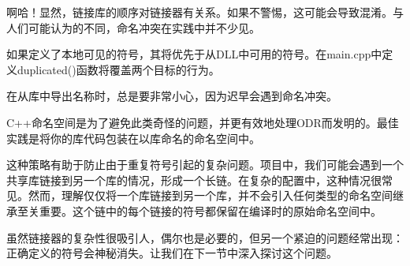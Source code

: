 啊哈！显然，链接库的顺序对链接器有关系。如果不警惕，这可能会导致混淆。与人们可能认为的不同，命名冲突在实践中并不少见。

如果定义了本地可见的符号，其将优先于从DLL中可用的符号。在main.cpp中定义duplicated()函数将覆盖两个目标的行为。

在从库中导出名称时，总是要非常小心，因为迟早会遇到命名冲突。


C++命名空间是为了避免此类奇怪的问题，并更有效地处理ODR而发明的。最佳实践是将你的库代码包装在以库命名的命名空间中。

这种策略有助于防止由于重复符号引起的复杂问题。项目中，我们可能会遇到一个共享库链接到另一个库的情况，形成一个长链。在复杂的配置中，这种情况很常见。然而，理解仅仅将一个库链接到另一个库，并不会引入任何类型的命名空间继承至关重要。这个链中的每个链接的符号都保留在编译时的原始命名空间中。

虽然链接器的复杂性很吸引人，偶尔也是必要的，但另一个紧迫的问题经常出现：正确定义的符号会神秘消失。让我们在下一节中深入探讨这个问题。




